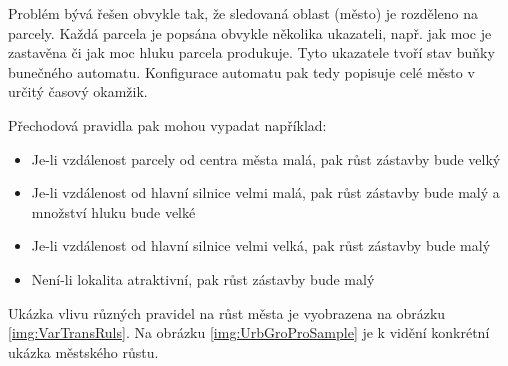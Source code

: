 Problém bývá řešen obvykle tak, že sledovaná oblast (město) je rozděleno na parcely. Každá parcela je popsána obvykle několika ukazateli, např. jak moc je zastavěna či jak moc hluku parcela produkuje. Tyto ukazatele tvoří stav buňky bunečného automatu. Konfigurace automatu pak tedy popisuje celé město v určitý časový okamžik.

Přechodová pravidla pak mohou vypadat například:
\begin{itemize}
 \item Je-li vzdálenost parcely od centra města malá, pak růst zástavby bude velký
 \item Je-li vzdálenost od hlavní silnice velmi malá, pak růst zástavby bude malý a množství hluku bude velké
 \item Je-li vzdálenost od hlavní silnice velmi velká, pak růst zástavby bude malý
 \item Není-li lokalita atraktivní, pak růst zástavby bude malý
\end{itemize}

Ukázka vlivu různých pravidel na růst města je vyobrazena na obrázku \ref{img:VarTransRuls}. Na obrázku \ref{img:UrbGroProSample} je k vidění konkrétní ukázka městského růstu.

